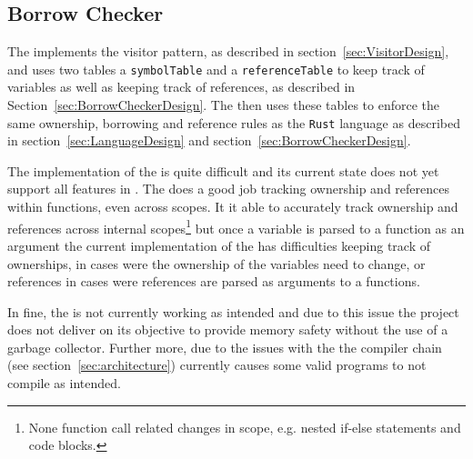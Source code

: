 \subsection{Borrow Checker}
\label{sec:BorrowCheckerImpl}

The \borrowChecker{} implements the visitor pattern, as described in
section~\ref{sec:VisitorDesign}, and uses two tables a
\texttt{symbolTable} and a \texttt{referenceTable} to keep track of variables as well
as keeping track of references, as described in
Section~\ref{sec:BorrowCheckerDesign}. The \borrowChecker{} then uses these tables to enforce the
same ownership, borrowing and reference rules as the \texttt{Rust} language as described
in section~\ref{sec:LanguageDesign} and section~\ref{sec:BorrowCheckerDesign}. \\


The implementation of the \borrowChecker{} is quite difficult and its current state
does not yet support all features in \lang{}. 
The \borrowChecker{} does a good job tracking ownership and references within
functions, even across scopes. It it able to accurately track ownership and
references across internal scopes\footnote{None function call related changes in
scope, e.g. nested if-else statements and code blocks.} but once a variable is parsed
to a function as an argument the current implementation of the \borrowChecker{} has
difficulties keeping track of ownerships, in cases were the ownership of the
variables need to change, or references in cases were references are parsed as
arguments to a functions.

In fine, the \borrowChecker{} is not currently working as intended and due to this
issue the project does not deliver on its objective to provide memory safety without
the use of a garbage collector. Further more, due to the issues with the
\borrowChecker{} the compiler chain (see section~\ref{sec:architecture}) currently
causes some valid programs to not compile as intended.
